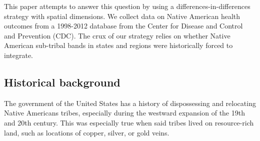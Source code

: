 \documentclass[12pt]{article}
\begin{document}
This paper attempts to answer this question by using a differences-in-differences strategy with spatial dimensions. 
We collect data on Native American health outcomes from a 1998-2012 database from the Center for Disease and Control and Prevention (CDC).
The crux of our strategy relies on whether Native American sub-tribal bands in states and regions were historically forced to integrate.

\subsection{Historical background}
The government of the United States has a history of dispossessing and relocating Native Americans tribes, especially during the westward expansion of the 19th and 20th century.
This was especially true when said tribes lived on resource-rich land, such as locations of copper, silver, or gold veins. 
\end{document}
